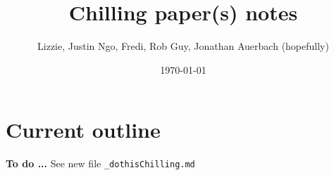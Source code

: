 \documentclass[11pt,letter]{article}
\begin{document}

\renewcommand{\refname}{\CHead{}}

\title{Chilling paper(s) notes}
\author{Lizzie, Justin Ngo, Fredi, Rob Guy, Jonathan Auerbach (hopefully)} %
\date{\today}
\maketitle
\tableofcontents



\section{Current outline} %

{\bf To do ... } See new file \verb|_dothisChilling.md|\\
\end{document}

